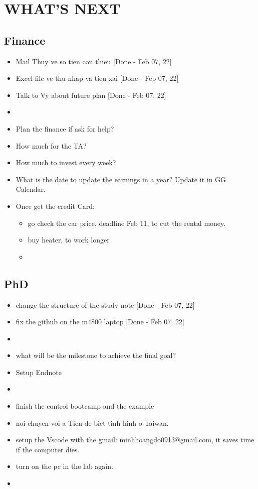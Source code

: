 \section{WHAT'S NEXT}

\subsection{Finance}
\begin{itemize}
    \item Mail Thuy ve so tien con thieu [Done - Feb 07, 22]
    \item Excel file ve thu nhap va tieu xai [Done - Feb 07, 22]
    \item Talk to Vy about future plan [Done - Feb 07, 22]
    \item 
    \item Plan the finance if ask for help?
    \item How much for the TA?
    \item How much to invest every week?
    \item What is the date to update the earnings in a year? Update it in GG Calendar.
    \item Once get the credit Card:
        \begin{itemize}
            \item go check the car price, deadline Feb 11, to cut the rental money.
            \item buy heater, to work longer
            \item 
        \end{itemize}
\end{itemize}

\subsection{PhD}
\begin{itemize}
    \item change the structure of the study note [Done - Feb 07, 22]
    \item fix the github on the m4800 laptop [Done - Feb 07, 22]
    \item 
    \item what will be the milestone to achieve the final goal?
    \item Setup Endnote
    \item 
    \item finish the control bootcamp and the example
    \item noi chuyen voi a Tien de biet tinh hinh o Taiwan.
    \item setup the Vscode with the gmail: minhhoangdo0913@gmail.com, it saves time if the computer dies.
    \item turn on the pc in the lab again.
    \item 
\end{itemize}

